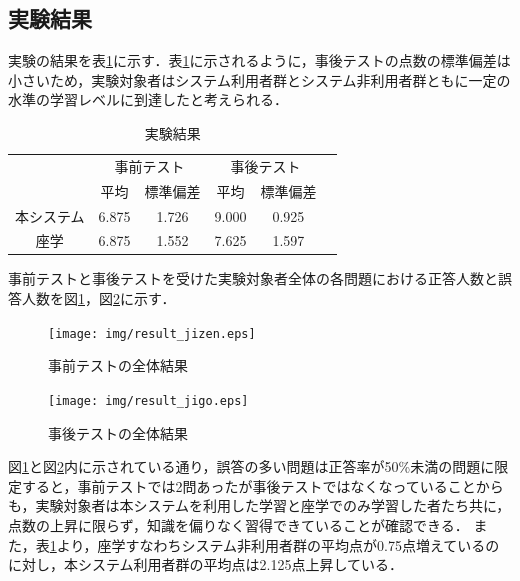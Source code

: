 \subsection{実験結果}
実験の結果を表\ref{tab:result1}に示す．表\ref{tab:result1}に示されるように，事後テストの点数の標準偏差は小さいため，実験対象者はシステム利用者群とシステム非利用者群ともに一定の水準の学習レベルに到達したと考えられる．
\begin{table}[tb]
    \centering
    \caption{実験結果}
    \label{tab:result1}
    \begin{tabular}{|c|c|c|c|c|c}
    \hline
     & \multicolumn{2}{c|}{事前テスト} & \multicolumn{2}{c|}{事後テスト} \\ \cline{2-5}
     & 平均 & 標準偏差 & 平均 & 標準偏差 \\ \hline
     本システム & 6.875 & 1.726 & 9.000 & 0.925 \\ \hline
     座学 & 6.875 & 1.552 & 7.625 & 1.597 \\ \hline
    \end{tabular}
\end{table}

事前テストと事後テストを受けた実験対象者全体の各問題における正答人数と誤答人数を図\ref{fig:result_jizen}，図\ref{fig:result_jigo}に示す．


\begin{figure}[htbp]
\begin{center}
\texttt{[image: img/result\_jizen.eps]}
\end{center}
\caption{事前テストの全体結果}
\label{fig:result_jizen}
\end{figure}

\begin{figure}[htbp]
\begin{center}
\texttt{[image: img/result\_jigo.eps]}
\end{center}
\caption{事後テストの全体結果}
\label{fig:result_jigo}
\end{figure}

図\ref{fig:result_jizen}と図\ref{fig:result_jigo}内に示されている通り，誤答の多い問題は正答率が50\%未満の問題に限定すると，事前テストでは2問あったが事後テストではなくなっていることからも，実験対象者は本システムを利用した学習と座学でのみ学習した者たち共に，点数の上昇に限らず，知識を偏りなく習得できていることが確認できる．
また，表\ref{tab:result1}より，座学すなわちシステム非利用者群の平均点が0.75点増えているのに対し，本システム利用者群の平均点は2.125点上昇している．

